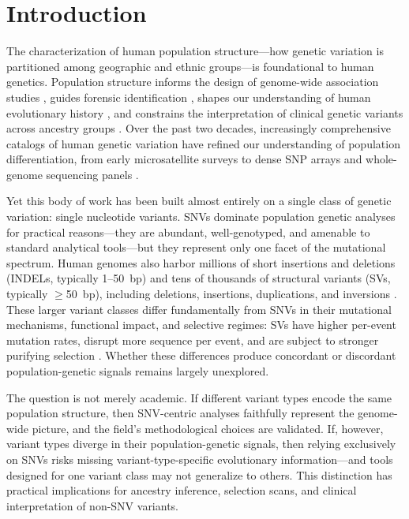 \section*{Introduction}

The characterization of human population structure---how genetic variation is partitioned among geographic and ethnic groups---is foundational to human genetics. Population structure informs the design of genome-wide association studies \citep{price2006, marchini2010}, guides forensic identification \citep{phillips2015}, shapes our understanding of human evolutionary history \citep{cavalli1994}, and constrains the interpretation of clinical genetic variants across ancestry groups \citep{martin2019}. Over the past two decades, increasingly comprehensive catalogs of human genetic variation have refined our understanding of population differentiation, from early microsatellite surveys \citep{rosenberg2002} to dense SNP arrays \citep{li2008} and whole-genome sequencing panels \citep{1000genomes2015, byrskaBishop2022}.

Yet this body of work has been built almost entirely on a single class of genetic variation: single nucleotide variants. SNVs dominate population genetic analyses for practical reasons---they are abundant, well-genotyped, and amenable to standard analytical tools---but they represent only one facet of the mutational spectrum. Human genomes also harbor millions of short insertions and deletions (INDELs, typically 1--50~bp) and tens of thousands of structural variants (SVs, typically $\geq$50~bp), including deletions, insertions, duplications, and inversions \citep{sudmant2015, collins2020, byrskaBishop2022}. These larger variant classes differ fundamentally from SNVs in their mutational mechanisms, functional impact, and selective regimes: SVs have higher per-event mutation rates, disrupt more sequence per event, and are subject to stronger purifying selection \citep{abel2020, audano2019}. Whether these differences produce concordant or discordant population-genetic signals remains largely unexplored.

The question is not merely academic. If different variant types encode the same population structure, then SNV-centric analyses faithfully represent the genome-wide picture, and the field's methodological choices are validated. If, however, variant types diverge in their population-genetic signals, then relying exclusively on SNVs risks missing variant-type-specific evolutionary information---and tools designed for one variant class may not generalize to others. This distinction has practical implications for ancestry inference, selection scans, and clinical interpretation of non-SNV variants.

